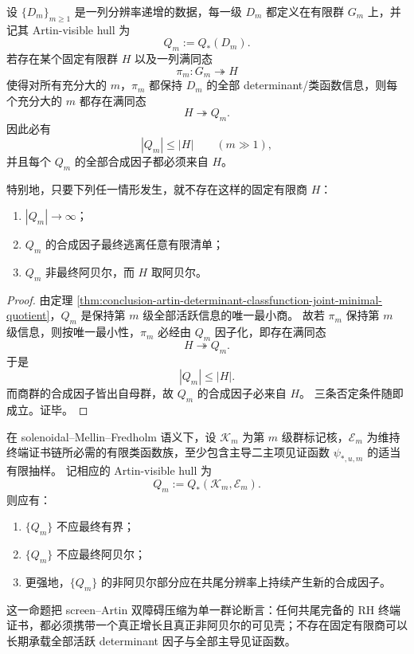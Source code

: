\begin{theorem}[共尾固定商不可能性]\label{thm:conclusion-artin-visible-hull-no-cofinal-fixed-quotient}
设 \(\{D_m\}_{m\ge 1}\) 是一列分辨率递增的数据，每一级 \(D_m\) 都定义在有限群 \(G_m\) 上，并记其 Artin-visible hull 为
\[
Q_m:=Q_\ast(D_m).
\]
若存在某个固定有限群 \(H\) 以及一列满同态
\[
\pi_m:G_m\twoheadrightarrow H
\]
使得对所有充分大的 \(m\)，\(\pi_m\) 都保持 \(D_m\) 的全部 determinant/类函数信息，则每个充分大的 \(m\) 都存在满同态
\[
H\twoheadrightarrow Q_m.
\]
因此必有
\[
|Q_m|\le |H|
\qquad (m\gg 1),
\]
并且每个 \(Q_m\) 的全部合成因子都必须来自 \(H\)。

特别地，只要下列任一情形发生，就不存在这样的固定有限商 \(H\)：
\begin{enumerate}
  \item \(|Q_m|\to\infty\)；
  \item \(Q_m\) 的合成因子最终逃离任意有限清单；
  \item \(Q_m\) 非最终阿贝尔，而 \(H\) 取阿贝尔。
\end{enumerate}
\end{theorem}

\begin{proof}
由定理 \ref{thm:conclusion-artin-determinant-classfunction-joint-minimal-quotient}，\(Q_m\) 是保持第 \(m\) 级全部活跃信息的唯一最小商。
故若 \(\pi_m\) 保持第 \(m\) 级信息，则按唯一最小性，\(\pi_m\) 必经由 \(Q_m\) 因子化，即存在满同态
\[
H\twoheadrightarrow Q_m.
\]
于是
\[
|Q_m|\le |H|.
\]
而商群的合成因子皆出自母群，故 \(Q_m\) 的合成因子必来自 \(H\)。
三条否定条件随即成立。证毕。
\end{proof}

\begin{conjecture}[共尾 RH 证书的非阿贝尔可见壳增长]\label{conj:conclusion-solenoidal-rh-visible-hull-growth}
在 solenoidal--Mellin--Fredholm 语义下，设 \(\mathcal K_m\) 为第 \(m\) 级群标记核，\(\mathcal E_m\) 为维持终端证书链所必需的有限类函数族，至少包含主导二主项见证函数 \(\psi_{\ast,u,m}\) 的适当有限抽样。
记相应的 Artin-visible hull 为
\[
Q_m:=Q_\ast(\mathcal K_m,\mathcal E_m).
\]
则应有：
\begin{enumerate}
  \item \(\{Q_m\}\) 不应最终有界；
  \item \(\{Q_m\}\) 不应最终阿贝尔；
  \item 更强地，\(\{Q_m\}\) 的非阿贝尔部分应在共尾分辨率上持续产生新的合成因子。
\end{enumerate}
\end{conjecture}

这一命题把 screen--Artin 双障碍压缩为单一群论断言：任何共尾完备的 RH 终端证书，都必须携带一个真正增长且真正非阿贝尔的可见壳；不存在固定有限商可以长期承载全部活跃 determinant 因子与全部主导见证函数。

\endinput
